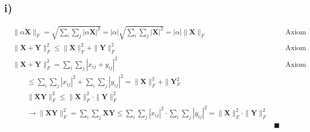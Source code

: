 \documentclass[fleqn]{article}
\begin{document}
\subsection*{i)}
\begin{align*}
	&\|\alpha\mathbf{X}\|_{F}=\sqrt{\sum_{i}\sum_{j}\left|\alpha\mathbf{X}\right|^{2}}=\left|\alpha\right|\sqrt{\sum_{i}\sum_{j}\left|\mathbf{X}\right|^{2}}=\left|\alpha\right|\|\mathbf{X}\|_{F}& &\text{Axiom 2}& \\
	&\|\mathbf{X+Y}\|_{F}^{2}\le\|\mathbf{X}\|_{F}^{2}+\|\mathbf{Y}\|_{F}^{2}& &\text{Axiom 3}& \\
	&\|\mathbf{X+Y}\|_{F}^{2}=\sum_{i}\sum_{j}\left|x_{ij}+y_{ij}\right|^{2}& &\text{Axiom 4}& \\
	&\qquad\le\sum_{i}\sum_{j}\left|x_{ij}\right|^{2}+\sum_{i}\sum_{j}\left|y_{ij}\right|^{2}=\|\mathbf{X}\|_{F}^{2}+\|\mathbf{Y}_{F}^{2}& \\
	&\qquad\|\mathbf{XY}\|_{F}^{2}\le\|\mathbf{X}\|_{F}^{2}\cdot\|\mathbf{Y}\|_{F}^{2}& \\
	&\qquad\rightarrow\|\mathbf{XY}\|_{F}^{2}=\sum_{i}\sum_{j}\mathbf{XY}\le\sum_{i}\sum_{j}\left|x_{ij}\right|^{2}\cdot\sum_{i}\sum_{j}\left|y_{ij}\right|^{2}=\|\mathbf{X}\|_{F}^{2}\cdot\|\mathbf{Y}\|_{F}^{2} & \\
	& &\blacksquare
\end{align*}
\end{document}
